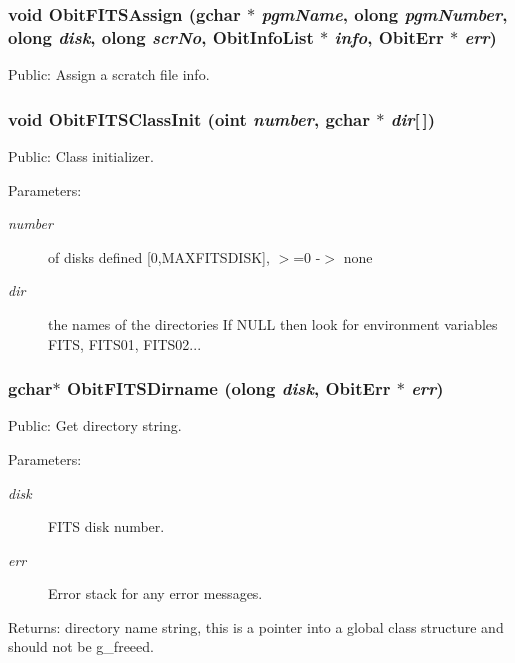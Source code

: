 \subsubsection{\setlength{\rightskip}{0pt plus 5cm}void Obit\-FITSAssign (gchar $\ast$ {\em pgm\-Name}, {\bf olong} {\em pgm\-Number}, {\bf olong} {\em disk}, {\bf olong} {\em scr\-No}, {\bf Obit\-Info\-List} $\ast$ {\em info}, {\bf Obit\-Err} $\ast$ {\em err})}\label{ObitFITS_8h_a10}


Public: Assign a scratch file info. 

\subsubsection{\setlength{\rightskip}{0pt plus 5cm}void Obit\-FITSClass\-Init ({\bf oint} {\em number}, gchar $\ast$ {\em dir}[$\,$])}\label{ObitFITS_8h_a2}


Public: Class initializer. 

\begin{Desc}
\item[Parameters:]
\begin{description}
\item[{\em number}]of disks defined [0,MAXFITSDISK], $>$=0 -$>$ none \item[{\em dir}]the names of the directories If NULL then look for environment variables FITS, FITS01, FITS02... \end{description}
\end{Desc}
\subsubsection{\setlength{\rightskip}{0pt plus 5cm}gchar$\ast$ Obit\-FITSDirname ({\bf olong} {\em disk}, {\bf Obit\-Err} $\ast$ {\em err})}\label{ObitFITS_8h_a9}


Public: Get directory string. 

\begin{Desc}
\item[Parameters:]
\begin{description}
\item[{\em disk}]FITS disk number. \item[{\em err}]Error stack for any error messages. \end{description}
\end{Desc}
\begin{Desc}
\item[Returns:]directory name string, this is a pointer into a global class structure and should not be g\_\-freeed. \end{Desc}
